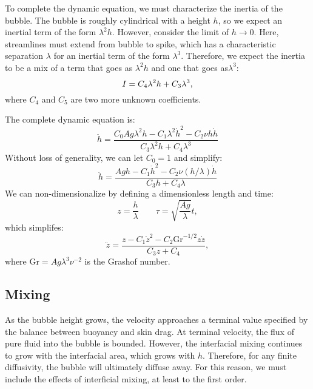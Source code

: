 To complete the dynamic equation, we must characterize the inertia of the bubble.
The bubble is roughly cylindrical with a height $h$, so we expect an inertial term of the form $\lambda^2 h$.
However, consider the limit of $h \rightarrow 0$.  
Here, streamlines must extend from bubble to spike, which has a characteristic separation $\lambda$ for an inertial term of the form $\lambda^3$.
Therefore, we expect the inertia to be a mix of a term that goes as $\lambda^2 h$ and one that goes as$\lambda^3$:
\begin{equation} \elabel{inertia}
I = C_4 \lambda^2 h + C_3 \lambda^3,
\end{equation}
where $C_4$ and $C_5$ are two more unknown coefficients.

The complete dynamic equation is:
\begin{equation}
\ddot{h} = \frac{C_0 A g \lambda^2 h - C_1 \lambda^2 \dot{h}^2 - C_2 \nu h \dot{h}}{C_3 \lambda^2 h + C_4 \lambda^3}
\end{equation}
Without loss of generality, we can let $C_0 = 1$ and simplify:
\begin{equation}
\ddot{h} = \frac{A g h - C_1 \dot{h}^2 - C_2 \nu (h/\lambda) \dot{h}}{ C_3 h + C_4 \lambda }
\end{equation}
We can non-dimensionalize by defining a dimensionless length and time:
\begin{equation}
z = \frac{h}{\lambda} \qquad \tau = \sqrt{\frac{A g}{\lambda}} t,
\end{equation}
which simplifes:
\begin{equation}
\ddot{z} = \frac{z - C_1 \dot{z}^2 - C_2 \text{Gr}^{-1/2} z \dot{z}}{C_3 z + C_4},
\end{equation}
where $\text{Gr} = A g \lambda^3 \nu^{-2}$ is the Grashof number.


\subsection{Mixing}

As the bubble height grows, the velocity approaches a terminal value specified by the balance between buoyancy and skin drag.
At terminal velocity, the flux of pure fluid into the bubble is bounded.
However, the interfacial mixing continues to grow with the interfacial area, which grows with $h$.
Therefore, for any finite diffusivity, the bubble will ultimately diffuse away.
For this reason, we must include the effects of interficial mixing, at least to the first order.


